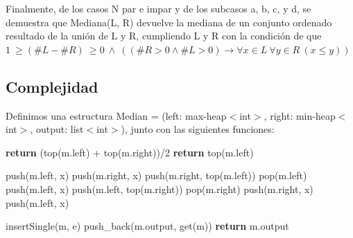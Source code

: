 \documentclass{article}
\theoremstyle{definition}
\theoremstyle{remark}
\begin{document}
Finalmente, de los casos N par e impar y de los subcasos a, b, c, y d, se demuestra que 
Mediana(L, R) devuelve la mediana de un conjunto ordenado resultado de la unión de L y R, cumpliendo L y R con la condición de que $1 \ \geq (\#L - \#R) \ \geq 0 \ \wedge \ ((\#R > 0 \wedge \#L >0) \rightarrow \forall x \in L \ \forall y \in R \ (x \leq y))$

\subsection{Complejidad}

Definimos una estructura Median = (left: max-heap$<$int$>$, right: min-heap$<$int$>$, output: list$<$int$>$), junto con las siguientes funciones:

\begin{algorithmic}
\State \textbf{return} (top(m.left) + top(m.right))/2 
\Else
\State \textbf{return} top(m.left) 
\EndIf
\EndProcedure \\
\end{algorithmic}

\begin{algorithmic}
    \State push(m.left, x)
        \State push(m.right, x)
    \Else
        \State push(m.right, top(m.left))
        \State pop(m.left)
        \State push(m.left, x)
    \EndIf
\Else
        \State push(m.left, top(m.right))
        \State pop(m.right)
        \State push(m.right, x)
    \Else
        \State push(m.left, x)
    \EndIf
\EndIf
\EndProcedure \\
\end{algorithmic}

\begin{algorithmic}
 
    \State insertSingle(m, e) 
    \State push\_back(m.output, get(m)) 
\EndFor
\State \textbf{return} m.output
\EndProcedure \\ \\
\end{algorithmic}
\end{document}
